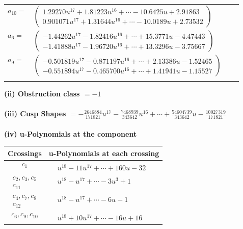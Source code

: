 \documentclass[1p]{elsarticle_modified}
\theoremstyle{definition}
\begin{document}
\begin{tabular}{m{7pt} m{180pt} m{7pt} m{180pt} }
\flushright $a_{10}=$&$\begin{pmatrix}1.29270 u^{17}+1.81223 u^{16}+\cdots-10.6425 u+2.91863\\0.901071 u^{17}+1.31644 u^{16}+\cdots-10.0189 u+2.73532\end{pmatrix}$ \\
\flushright $a_{6}=$&$\begin{pmatrix}-1.44262 u^{17}-1.82416 u^{16}+\cdots+15.3771 u-4.47443\\-1.41888 u^{17}-1.96720 u^{16}+\cdots+13.3296 u-3.75667\end{pmatrix}$ \\
\flushright $a_{9}=$&$\begin{pmatrix}-0.501819 u^{17}-0.871197 u^{16}+\cdots+2.13386 u-1.52465\\-0.551894 u^{17}-0.465700 u^{16}+\cdots+1.41941 u-1.15527\end{pmatrix}$\\&\end{tabular}
\flushleft \textbf{(ii) Obstruction class $= -1$}\\~\\
\flushleft \textbf{(iii) Cusp Shapes $= -\frac{2646884}{171821} u^{17}-\frac{7468939}{343642} u^{16}+\cdots+\frac{54604739}{343642} u-\frac{10027319}{171821}$}\\~\\
\newpage\renewcommand{\arraystretch}{1}
\flushleft \textbf{(iv) u-Polynomials at the component}\newline \\
\begin{tabular}{m{50pt}|m{274pt}}
Crossings & \hspace{64pt}u-Polynomials at each crossing \\
\hline $$\begin{aligned}c_{1}\end{aligned}$$&$\begin{aligned}
&u^{18}-11 u^{17}+\cdots+160 u-32
\end{aligned}$\\
\hline $$\begin{aligned}c_{2},c_{3},c_{5}\\c_{11}\end{aligned}$$&$\begin{aligned}
&u^{18}- u^{17}+\cdots-3 u^3+1
\end{aligned}$\\
\hline $$\begin{aligned}c_{4},c_{7},c_{8}\\c_{12}\end{aligned}$$&$\begin{aligned}
&u^{18}- u^{17}+\cdots-6 u-1
\end{aligned}$\\
\hline $$\begin{aligned}c_{6},c_{9},c_{10}\end{aligned}$$&$\begin{aligned}
&u^{18}+10 u^{17}+\cdots-16 u+16
\end{aligned}$\\
\hline
\end{tabular}\\~\\
\end{document}
